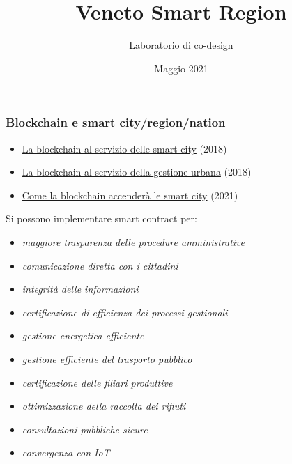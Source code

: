 \documentclass[11pt]{beamer}  %
\subtitle{Laboratorio di co-design}
\title{Veneto Smart Region}
\institute{Universit\`a di Verona}
\date{Maggio 2021}
\begin{document}
\begin{frame}
  \titlepage
\end{frame}

\begin{frame}\frametitle{Blockchain e smart city/region/nation}

  \begin{itemize}
  \item \href{https://www.am.pictet/it/blog/articoli/tecnologia-e-innovazione/la-blockchain-al-servizio-delle-smart-city}{La blockchain al servizio delle smart city} (2018)
  \item \href{https://www.iberdrola.com/innovation/blockchain-for-smart-cities-urban-management}{La blockchain al servizio della gestione urbana} (2018)
  \item \href{https://www.weforum.org/agenda/2021/04/how-blockchain-can-empower-smart-cities-gtgs21}{Come la blockchain accender\`a le smart city} (2021)
  \end{itemize}

  \medskip
  Si possono implementare \alert{smart contract} per:
  \begin{itemize}
  \item \emph{maggiore trasparenza delle procedure amministrative}
  \item \emph{comunicazione diretta con i cittadini}
  \item \emph{integrit\`a delle informazioni}
  \item \emph{certificazione di efficienza dei processi gestionali}
  \item \emph{gestione energetica efficiente}
  \item \emph{gestione efficiente del trasporto pubblico}
  \item \emph{certificazione delle filiari produttive}
  \item \emph{ottimizzazione della raccolta dei rifiuti}
  \item \emph{consultazioni pubbliche sicure}
  \item \emph{convergenza con IoT}
  \end{itemize}

\end{frame}
\end{document}
